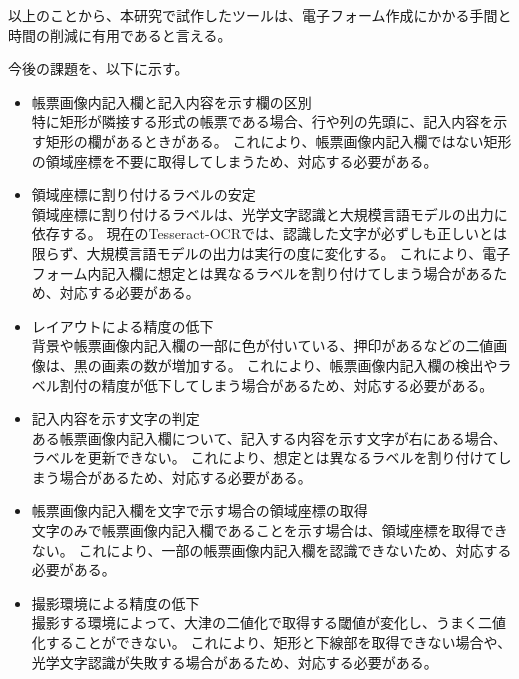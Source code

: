 以上のことから、本研究で試作したツールは、電子フォーム作成にかかる手間と時間の削減に有用であると言える。

今後の課題を、以下に示す。

\begin{itemize}
    \item 帳票画像内記入欄と記入内容を示す欄の区別\\
        特に矩形が隣接する形式の帳票である場合、行や列の先頭に、記入内容を示す矩形の欄があるときがある。
        これにより、帳票画像内記入欄ではない矩形の領域座標を不要に取得してしまうため、対応する必要がある。
    \item 領域座標に割り付けるラベルの安定\\
        領域座標に割り付けるラベルは、光学文字認識と大規模言語モデルの出力に依存する。
        現在のTesseract-OCRでは、認識した文字が必ずしも正しいとは限らず、大規模言語モデルの出力は実行の度に変化する。
        これにより、電子フォーム内記入欄に想定とは異なるラベルを割り付けてしまう場合があるため、対応する必要がある。
    \item レイアウトによる精度の低下\\
        背景や帳票画像内記入欄の一部に色が付いている、押印があるなどの二値画像は、黒の画素の数が増加する。
        これにより、帳票画像内記入欄の検出やラベル割付の精度が低下してしまう場合があるため、対応する必要がある。
    \item 記入内容を示す文字の判定\\
        ある帳票画像内記入欄について、記入する内容を示す文字が右にある場合、ラベルを更新できない。
        これにより、想定とは異なるラベルを割り付けてしまう場合があるため、対応する必要がある。
    \item 帳票画像内記入欄を文字で示す場合の領域座標の取得\\
        文字のみで帳票画像内記入欄であることを示す場合は、領域座標を取得できない。
        これにより、一部の帳票画像内記入欄を認識できないため、対応する必要がある。
    \item 撮影環境による精度の低下\\
        撮影する環境によって、大津の二値化で取得する閾値が変化し、うまく二値化することができない。
        これにより、矩形と下線部を取得できない場合や、光学文字認識が失敗する場合があるため、対応する必要がある。
\end{itemize}